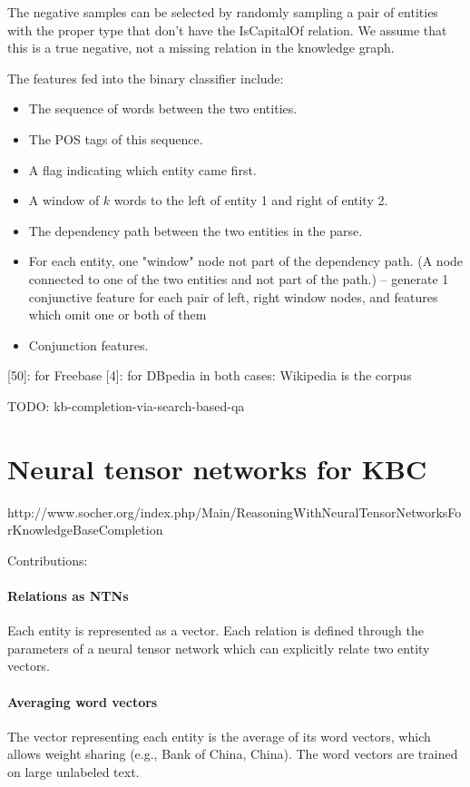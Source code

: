 The negative samples can be selected
by randomly sampling a pair of entities with the proper type that don't have the
IsCapitalOf relation. We assume that this is a true negative, not a missing
relation in the knowledge graph.

The features fed into the binary classifier include:
\begin{itemize}
\item The sequence of words between the two entities.
\item The POS tags of this sequence.
\item A flag indicating which entity came first.
\item A window of $k$ words to the left of entity 1 and right of entity 2.
\item The dependency path between the two entities in the parse.
\item For each entity, one "window" node not part of the dependency path.
	(A node connected to one of the two entities and not part of the path.)
		-- generate 1 conjunctive feature for each pair of left, right
		window nodes, and features which omit one or both of them
	\cite{distant-supervision}
\item Conjunction features.
\end{itemize}

[50]: for Freebase
[4]: for DBpedia
in both cases: Wikipedia is the corpus

TODO: kb-completion-via-search-based-qa

\section{Neural tensor networks for KBC}
\label{neural-tensor-networks-for-kbc}

http://www.socher.org/index.php/Main/ReasoningWithNeuralTensorNetworksForKnowledgeBaseCompletion

Contributions:

\paragraph{Relations as NTNs}
Each entity is represented as a vector. Each relation is defined through the
parameters of a neural tensor network which can explicitly relate two entity
vectors.

\paragraph{Averaging word vectors}
The vector representing each entity is the average of its word vectors, which
allows weight sharing (e.g., Bank of China, China).
The word vectors are trained on large unlabeled text.

